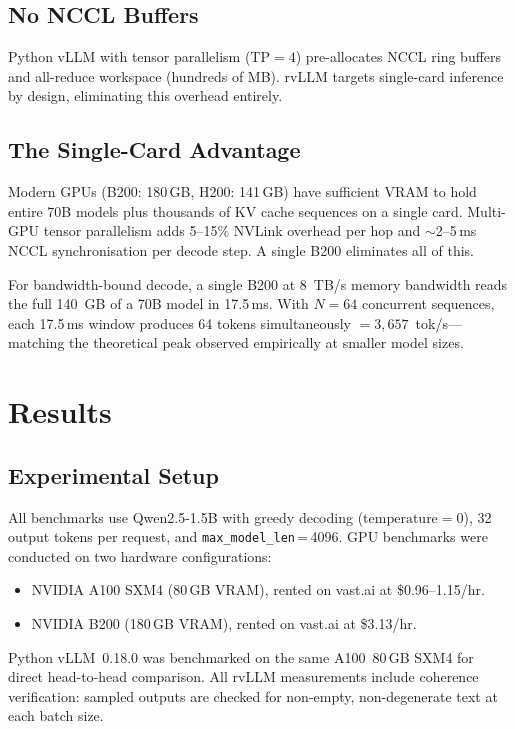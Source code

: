 \subsection{No NCCL Buffers}

Python vLLM with tensor parallelism ($\text{TP}\!=\!4$) pre-allocates NCCL ring
buffers and all-reduce workspace (hundreds of MB). rvLLM targets single-card
inference by design, eliminating this overhead entirely.

\subsection{The Single-Card Advantage}

Modern GPUs (B200: 180\,GB, H200: 141\,GB) have sufficient VRAM to hold entire
70B models plus thousands of KV cache sequences on a single card. Multi-GPU tensor
parallelism adds 5--15\% NVLink overhead per hop and $\sim$2--5\,ms NCCL
synchronisation per decode step. A single B200 eliminates all of this.

For bandwidth-bound decode, a single B200 at 8~TB/s memory bandwidth reads the
full 140~GB of a 70B model in 17.5\,ms. With $N\!=\!64$ concurrent sequences,
each 17.5\,ms window produces 64 tokens simultaneously $= 3{,}657$~tok/s---matching
the theoretical peak observed empirically at smaller model sizes.

\section{Results}
\label{sec:results}

\subsection{Experimental Setup}

All benchmarks use Qwen2.5-1.5B with greedy decoding ($\text{temperature}\!=\!0$),
32 output tokens per request, and \texttt{max\_model\_len}\,=\,4096. GPU benchmarks
were conducted on two hardware configurations:
\begin{itemize}
  \item NVIDIA A100 SXM4 (80\,GB VRAM), rented on vast.ai at \$0.96--1.15/hr.
  \item NVIDIA B200 (180\,GB VRAM), rented on vast.ai at \$3.13/hr.
\end{itemize}
Python vLLM~0.18.0 was benchmarked on the same A100~80\,GB SXM4 for direct
head-to-head comparison. All rvLLM measurements include coherence verification:
sampled outputs are checked for non-empty, non-degenerate text at each batch size.


